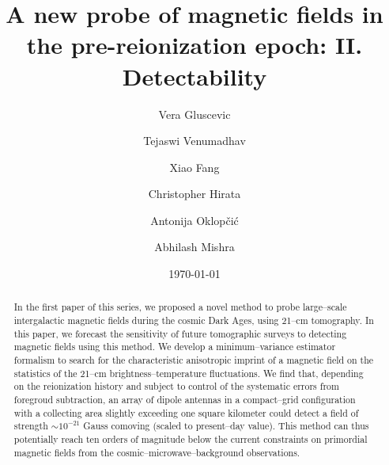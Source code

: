 \documentclass[aps,prd,twocolumn,floatfix,showpacs,superscriptaddress,nofootinbib]{revtex4-1}
\begin{document}
\widetext    
\title{A new probe of magnetic fields in the pre-reionization epoch: II. Detectability}
\author{Vera Gluscevic}
\author{Tejaswi Venumadhav}
\author{Xiao Fang}
\author{Christopher Hirata}
\author{Antonija Oklop\v ci\' c}
\author{Abhilash Mishra} 
\date{\today}
    

\begin{abstract} 
In the first paper of this series, we proposed a novel method to probe large--scale intergalactic magnetic fields during the cosmic Dark Ages, using 21--cm tomography. In this paper, we forecast the sensitivity of future tomographic surveys to detecting magnetic fields using this method. We develop a minimum--variance estimator formalism to search for the characteristic anisotropic imprint of a magnetic field on the statistics of the 21--cm brightness--temperature fluctuations. We find that, depending on the reionization history and subject to control of the systematic errors from foregroud subtraction, an array of dipole antennas in a compact--grid configuration with a collecting area slightly exceeding one square kilometer could detect a field of strength $\sim 10^{-21}$ Gauss comoving (scaled to present--day value). This method can thus potentially reach ten orders of magnitude below the current constraints on primordial magnetic fields from the cosmic--microwave--background observations. 
\end{abstract} 
        
\pacs{} 
\maketitle


\vspace{-15pt}





  
\appendix 

\label{app:Vrms} 

\label{app:lensing}

\label{app:fesc}



\end{document}
